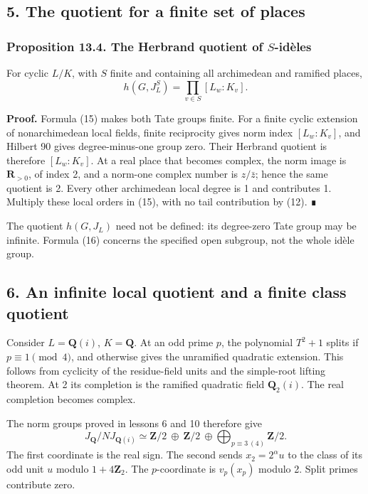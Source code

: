\documentclass[11pt,a4paper]{article}
\begin{document}
\subsection{5. The quotient for a finite set of
places}\label{the-quotient-for-a-finite-set-of-places}

\subsubsection{\texorpdfstring{Proposition 13.4. The Herbrand quotient
of
\(S\)-idèles}{Proposition 13.4. The Herbrand quotient of S-idèles}}\label{proposition-13.4.-the-herbrand-quotient-of-s-iduxe8les}

For cyclic \(L/K\), with \(S\) finite and containing all archimedean and
ramified places, \[
h(G,J_L^S)=\prod_{v\in S}[L_w:K_v].
\tag{16}
\]

\textbf{Proof.} Formula (15) makes both Tate groups finite. For a finite
cyclic extension of nonarchimedean local fields, finite reciprocity
gives norm index \([L_w:K_v]\), and Hilbert 90 gives degree-minus-one
group zero. Their Herbrand quotient is therefore \([L_w:K_v]\). At a
real place that becomes complex, the norm image is \(\mathbf R_{>0}\),
of index 2, and a norm-one complex number is \(z/\bar z\); hence the
same quotient is 2. Every other archimedean local degree is 1 and
contributes 1. Multiply these local orders in (15), with no tail
contribution by (12). ∎

The quotient \(h(G,J_L)\) need not be defined: its degree-zero Tate
group may be infinite. Formula (16) concerns the specified open
subgroup, not the whole idèle group.

\subsection{6. An infinite local quotient and a finite class
quotient}\label{an-infinite-local-quotient-and-a-finite-class-quotient}

Consider \(L=\mathbf Q(i)\), \(K=\mathbf Q\). At an odd prime \(p\), the
polynomial \(T^2+1\) splits if \(p\equiv1\pmod4\), and otherwise gives
the unramified quadratic extension. This follows from cyclicity of the
residue-field units and the simple-root lifting theorem. At 2 its
completion is the ramified quadratic field \(\mathbf Q_2(i)\). The real
completion becomes complex.

The norm groups proved in lessons 6 and 10 therefore give \[
J_{\mathbf Q}/N J_{\mathbf Q(i)}
\simeq \mathbf Z/2\ \oplus\ \mathbf Z/2\
        \oplus\!\!\bigoplus_{p\equiv3\ (4)}\mathbf Z/2.
\tag{17}
\] The first coordinate is the real sign. The second sends
\(x_2=2^\alpha u\) to the class of its odd unit \(u\) modulo
\(1+4\mathbf Z_2\). The \(p\)-coordinate is \(v_p(x_p)\) modulo 2. Split
primes contribute zero.
\end{document}
